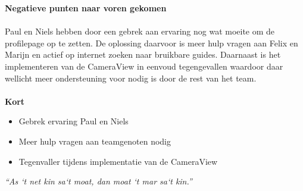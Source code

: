 \documentclass{uva-inf-article}
\begin{document}
\noindent
\textbf{Negatieve punten naar voren gekomen}\\\\
Paul en Niels hebben door een gebrek aan ervaring nog wat moeite om de profilepage op te zetten. De oplossing daarvoor is meer hulp vragen aan Felix en Marijn en actief op internet zoeken naar bruikbare guides. Daarnaast is het implementeren van de CameraView in eenvoud tegengevallen waardoor daar wellicht meer ondersteuning voor nodig is door de rest van het team.
\\\\

\noindent
\textbf{Kort}
\begin{itemize}
\item Gebrek ervaring Paul en Niels
\item Meer hulp vragen aan teamgenoten nodig
\item Tegenvaller tijdens implementatie van de CameraView

\end{itemize}

								\vfill	\hfill	\textit{“As `t net kin sa`t moat, dan moat `t mar sa`t kin.”}

\end{document}

